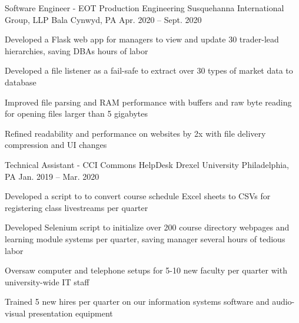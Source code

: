 

\begin{cventries}

  \cventry
  {Software Engineer - EOT Production Engineering} %
  {Susquehanna International Group, LLP} %
  {Bala Cynwyd, PA} %
  {Apr. 2020 -- Sept. 2020} %
  {
    \begin{cvitems} %
      \item {Developed a Flask web app for managers to view and update 30 trader-lead hierarchies, saving DBAs hours of labor}
      \item {Developed a file listener as a fail-safe to extract over 30 types of market data to database}
      \item {Improved file parsing and RAM performance with buffers and raw byte reading for opening files larger than 5 gigabytes}
      \item {Refined readability and performance on websites by 2x with file delivery compression and UI changes}
    \end{cvitems}
  }

  \cventry
  {Technical Assistant - CCI Commons HelpDesk} %
  {Drexel University} %
  {Philadelphia, PA} %
  {Jan. 2019 -- Mar. 2020} %
  {
    \begin{cvitems} %
      \item {Developed a script to to convert course schedule Excel sheets to CSVs for registering class livestreams per quarter }
      \item {Developed Selenium script to initialize over 200 course directory webpages and learning module systems per quarter, saving manager several hours of tedious labor}
      \item {Oversaw computer and telephone setups for 5-10 new faculty per quarter with university-wide IT staff}
      \item {Trained 5 new hires per quarter on our information systems software and audio-visual presentation equipment}
    \end{cvitems}
  }

\end{cventries}
